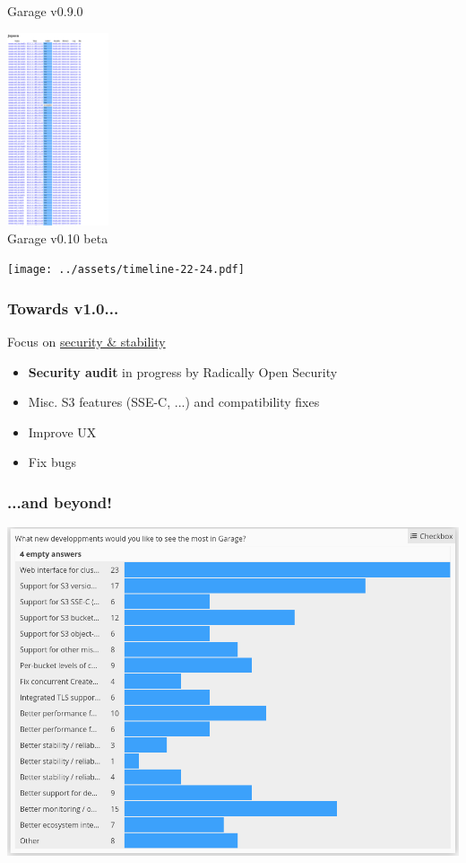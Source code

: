 \documentclass[aspectratio=169,xcolor={svgnames}]{beamer}
\begin{document}
\begin{frame}
\begin{minipage}{.23\textwidth}
		{\footnotesize Garage v0.9.0}
	\end{minipage}
	\begin{minipage}{.2\textwidth}
		\includegraphics[width=3cm]{../assets/jepsen-0.10.png}\\
		{\footnotesize Garage v0.10 beta}
	\end{minipage}
\end{frame}


\begin{frame}
	\begin{center}
		\texttt{[image: ../assets/timeline-22-24.pdf]}
	\end{center}
\end{frame}

\begin{frame}
	\frametitle{Towards v1.0...}
	Focus on \underline{security \& stability}
	\vspace{2em}
	\begin{itemize}
		\item \textbf{Security audit} in progress by Radically Open Security
			\vspace{1em}
		\item Misc. S3 features (SSE-C, ...) and compatibility fixes
			\vspace{1em}
		\item Improve UX
			\vspace{1em}
		\item Fix bugs
	\end{itemize}
\end{frame}

\begin{frame}
	\frametitle{...and beyond!}
	\begin{center}
		\includegraphics[width=.6\linewidth]{../assets/survey_requested_features.png}
	\end{center}
\end{frame}
\end{document}
